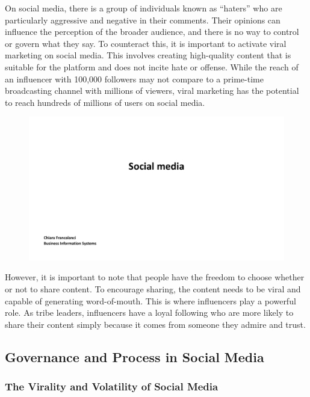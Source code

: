 On social media, there is a group of individuals known as ``haters'' who
are particularly aggressive and negative in their comments. Their
opinions can influence the perception of the broader audience, and there
is no way to control or govern what they say. To counteract this, it is
important to activate viral marketing on social media. This involves
creating high-quality content that is suitable for the platform and does
not incite hate or offense. While the reach of an influencer with
100,000 followers may not compare to a prime-time broadcasting channel
with millions of viewers, viral marketing has the potential to reach
hundreds of millions of users on social media.

\begin{figure}[!h]
    \centering
    \includegraphics[page=20, trim = 1cm 0cm 2cm 1cm, clip, width=\textwidth]{images/04 - Social_Media.pdf}
\end{figure}

However, it is important to note that people have the freedom to choose
whether or not to share content. To encourage sharing, the content needs
to be viral and capable of generating word-of-mouth. This is where
influencers play a powerful role. As tribe leaders, influencers have a
loyal following who are more likely to share their content simply
because it comes from someone they admire and trust.

\subsection{Governance and Process in Social
    Media}\label{governance-and-process-in-social-media}

\subsubsection{The Virality and Volatility of Social
    Media}\label{the-virality-and-volatility-of-social-media}

